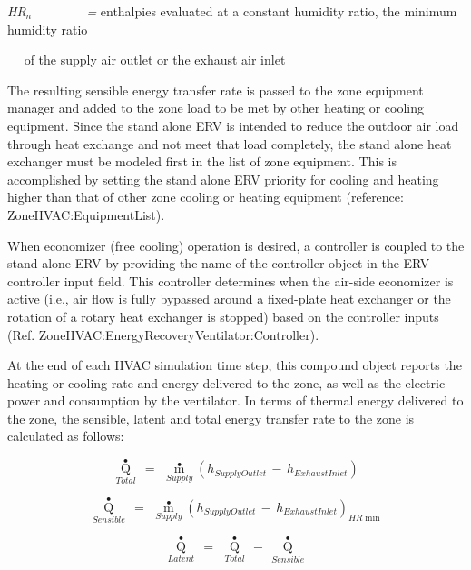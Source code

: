 \emph{HR\(_{n}\) ~~~~~~~ =} enthalpies evaluated at a constant humidity ratio, the minimum humidity ratio

~~ of the supply air outlet or the exhaust air inlet

The resulting sensible energy transfer rate is passed to the zone equipment manager and added to the zone load to be met by other heating or cooling equipment. Since the stand alone ERV is intended to reduce the outdoor air load through heat exchange and not meet that load completely, the stand alone heat exchanger must be modeled first in the list of zone equipment. This is accomplished by setting the stand alone ERV priority for cooling and heating higher than that of other zone cooling or heating equipment (reference: ZoneHVAC:EquipmentList).

When economizer (free cooling) operation is desired, a controller is coupled to the stand alone ERV by providing the name of the controller object in the ERV controller input field. This controller determines when the air-side economizer is active (i.e., air flow is fully bypassed around a fixed-plate heat exchanger or the rotation of a rotary heat exchanger is stopped) based on the controller inputs (Ref. ZoneHVAC:EnergyRecoveryVentilator:Controller).

At the end of each HVAC simulation time step, this compound object reports the heating or cooling rate and energy delivered to the zone, as well as the electric power and consumption by the ventilator. In terms of thermal energy delivered to the zone, the sensible, latent and total energy transfer rate to the zone is calculated as follows:

\begin{equation}
{\mathop Q\limits^ \bullet_{Total}}\, = \,\,{\mathop m\limits^ \bullet_{Supply}}{\left( {{h_{SupplyOutlet}}\, - \,{h_{ExhaustInlet}}} \right)_{}}
\end{equation}

\begin{equation}
{\mathop Q\limits^ \bullet_{Sensible}}\, = \,\,{\mathop m\limits^ \bullet_{Supply}}{\left( {{h_{SupplyOutlet}}\, - \,{h_{ExhaustInlet}}} \right)_{HR\min }}
\end{equation}

\begin{equation}
{\mathop Q\limits^ \bullet_{Latent}}\, = \,\,{\mathop Q\limits^ \bullet_{Total}}\, - \,{\mathop Q\limits^ \bullet_{Sensible}}
\end{equation}

